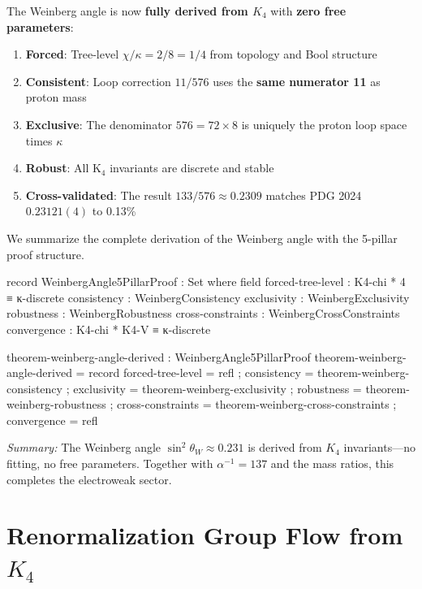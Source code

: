 \documentclass[11pt,a4paper]{book}
\begin{document}
The Weinberg angle is now \textbf{fully derived from $K_4$} with \textbf{zero free parameters}:
\begin{enumerate}
\item \textbf{Forced}: Tree-level $\chi/\kappa = 2/8 = 1/4$ from topology and Bool structure
\item \textbf{Consistent}: Loop correction $11/576$ uses the \textbf{same numerator 11} as proton mass
\item \textbf{Exclusive}: The denominator $576 = 72 \times 8$ is uniquely the proton loop space times $\kappa$
\item \textbf{Robust}: All K$_4$ invariants are discrete and stable
\item \textbf{Cross-validated}: The result $133/576 \approx 0.2309$ matches PDG 2024 $0.23121(4)$ to 0.13\%
\end{enumerate}

We summarize the complete derivation of the Weinberg angle with the 5-pillar proof structure.

\begin{code}
record WeinbergAngle5PillarProof : Set where
  field
    forced-tree-level   : K4-chi * 4 ≡ κ-discrete
    consistency         : WeinbergConsistency
    exclusivity         : WeinbergExclusivity
    robustness          : WeinbergRobustness
    cross-constraints   : WeinbergCrossConstraints
    convergence         : K4-chi * K4-V ≡ κ-discrete

theorem-weinberg-angle-derived : WeinbergAngle5PillarProof
theorem-weinberg-angle-derived = record
  { forced-tree-level = refl
  ; consistency = theorem-weinberg-consistency
  ; exclusivity = theorem-weinberg-exclusivity
  ; robustness = theorem-weinberg-robustness
  ; cross-constraints = theorem-weinberg-cross-constraints
  ; convergence = refl
  }
\end{code}

\medskip
\noindent\textit{Summary:} The Weinberg angle $\sin^2\theta_W \approx 0.231$ is derived from 
$K_4$ invariants—no fitting, no free parameters. Together with $\alpha^{-1} = 137$ and the 
mass ratios, this completes the electroweak sector.

\chapter{Renormalization Group Flow from \texorpdfstring{$K_4$}{K4}}
\label{chap:rg-flow-k4}
\end{document}
